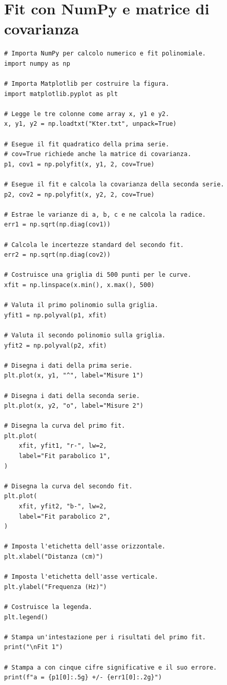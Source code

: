 \documentclass[11pt,a4paper]{book}
\begin{document}
\section{Fit con NumPy e matrice di covarianza}
\begin{lstlisting}
# Importa NumPy per calcolo numerico e fit polinomiale.
import numpy as np

# Importa Matplotlib per costruire la figura.
import matplotlib.pyplot as plt

# Legge le tre colonne come array x, y1 e y2.
x, y1, y2 = np.loadtxt("Kter.txt", unpack=True)

# Esegue il fit quadratico della prima serie.
# cov=True richiede anche la matrice di covarianza.
p1, cov1 = np.polyfit(x, y1, 2, cov=True)

# Esegue il fit e calcola la covarianza della seconda serie.
p2, cov2 = np.polyfit(x, y2, 2, cov=True)

# Estrae le varianze di a, b, c e ne calcola la radice.
err1 = np.sqrt(np.diag(cov1))

# Calcola le incertezze standard del secondo fit.
err2 = np.sqrt(np.diag(cov2))

# Costruisce una griglia di 500 punti per le curve.
xfit = np.linspace(x.min(), x.max(), 500)

# Valuta il primo polinomio sulla griglia.
yfit1 = np.polyval(p1, xfit)

# Valuta il secondo polinomio sulla griglia.
yfit2 = np.polyval(p2, xfit)

# Disegna i dati della prima serie.
plt.plot(x, y1, "^", label="Misure 1")

# Disegna i dati della seconda serie.
plt.plot(x, y2, "o", label="Misure 2")

# Disegna la curva del primo fit.
plt.plot(
    xfit, yfit1, "r-", lw=2,
    label="Fit parabolico 1",
)

# Disegna la curva del secondo fit.
plt.plot(
    xfit, yfit2, "b-", lw=2,
    label="Fit parabolico 2",
)

# Imposta l'etichetta dell'asse orizzontale.
plt.xlabel("Distanza (cm)")

# Imposta l'etichetta dell'asse verticale.
plt.ylabel("Frequenza (Hz)")

# Costruisce la legenda.
plt.legend()

# Stampa un'intestazione per i risultati del primo fit.
print("\nFit 1")

# Stampa a con cinque cifre significative e il suo errore.
print(f"a = {p1[0]:.5g} +/- {err1[0]:.2g}")


\end{lstlisting}
\end{document}
